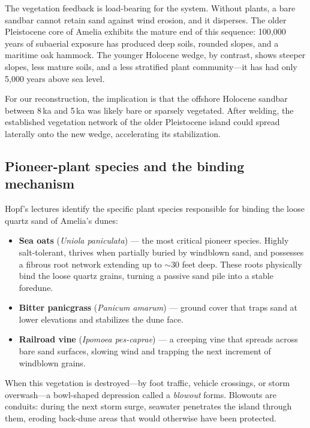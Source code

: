 \documentclass[11pt]{article}
\begin{document}
The vegetation feedback is load-bearing for the system. Without plants, a
bare sandbar cannot retain sand against wind erosion, and it disperses. The
older Pleistocene core of Amelia exhibits the mature end of this sequence:
100{,}000 years of subaerial exposure has produced deep soils, rounded
slopes, and a maritime oak hammock. The younger Holocene wedge, by contrast,
shows steeper slopes, less mature soils, and a less stratified plant
community---it has had only 5{,}000 years above sea level.

For our reconstruction, the implication is that the offshore Holocene
sandbar between 8\,ka and 5\,ka was likely bare or sparsely vegetated.
After welding, the established vegetation network of the older Pleistocene
island could spread laterally onto the new wedge, accelerating its
stabilization.

\subsection{Pioneer-plant species and the binding mechanism}

Hopf's lectures \cite{cn_hopf_videoreport} identify the specific plant
species responsible for binding the loose quartz sand of Amelia's dunes:

\begin{itemize}[leftmargin=2em]
\item \textbf{Sea oats} (\emph{Uniola paniculata}) --- the most critical
pioneer species. Highly salt-tolerant, thrives when partially buried by
windblown sand, and possesses a fibrous root network extending up to
$\sim$30 feet deep. These roots physically bind the loose quartz grains,
turning a passive sand pile into a stable foredune.
\item \textbf{Bitter panicgrass} (\emph{Panicum amarum}) --- ground cover
that traps sand at lower elevations and stabilizes the dune face.
\item \textbf{Railroad vine} (\emph{Ipomoea pes-caprae}) --- a creeping
vine that spreads across bare sand surfaces, slowing wind and trapping
the next increment of windblown grains.
\end{itemize}

\noindent When this vegetation is destroyed---by foot traffic, vehicle
crossings, or storm overwash---a bowl-shaped depression called a
\emph{blowout} forms. Blowouts are conduits: during the next storm
surge, seawater penetrates the island through them, eroding back-dune
areas that would otherwise have been protected.
\end{document}

